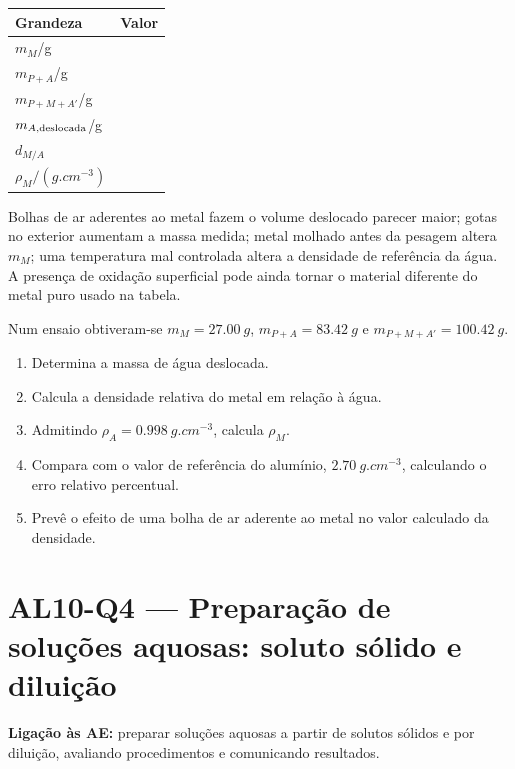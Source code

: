 \documentclass[11pt,a4paper,openany]{book}
\newcounter{exercicio}[chapter]
\renewcommand{\theexercicio}{\thechapter.\arabic{exercicio}}
\newenvironment{exercicio}[1][]%
{\refstepcounter{exercicio}%
\begin{tcolorbox}[breakable,colback=white,colframe=eublue!70,
 title={Exercício \theexercicio\if\relax\detokenize{#1}\relax\else\ --- #1\fi},fonttitle=\bfseries]}%
{\end{tcolorbox}}
\newcommand{\LigAE}[1]{\textbf{Ligação às AE:} #1}
\begin{document}
\begin{registo}
\begin{center}
\begin{tabular}{@{}lc@{}}
\toprule
Grandeza & Valor\\
\midrule
$m_M$/g &\\
$m_{P+A}$/g &\\
$m_{P+M+A'}$/g &\\
$m_{A,\rm deslocada}$/g &\\
$d_{M/A}$ &\\
$\rho_M/(\si{g.cm^{-3}})$ &\\
\bottomrule
\end{tabular}
\end{center}
\end{registo}

\begin{erros}
Bolhas de ar aderentes ao metal fazem o volume deslocado parecer maior; gotas no exterior aumentam a massa medida; metal molhado antes da pesagem altera $m_M$; uma temperatura mal controlada altera a densidade de referência da água. A presença de oxidação superficial pode ainda tornar o material diferente do metal puro usado na tabela.
\end{erros}

\begin{exercicio}[Identificar um metal]
Num ensaio obtiveram-se $m_M=\SI{27.00}{g}$, $m_{P+A}=\SI{83.42}{g}$ e $m_{P+M+A'}=\SI{100.42}{g}$.
\begin{enumerate}[label=\alph*)]
\item Determina a massa de água deslocada.
\item Calcula a densidade relativa do metal em relação à água.
\item Admitindo $\rho_A=\SI{0.998}{g.cm^{-3}}$, calcula $\rho_M$.
\item Compara com o valor de referência do alumínio, $\SI{2.70}{g.cm^{-3}}$, calculando o erro relativo percentual.
\item Prevê o efeito de uma bolha de ar aderente ao metal no valor calculado da densidade.
\end{enumerate}
\end{exercicio}

\section{AL10-Q4 — Preparação de soluções aquosas: soluto sólido e diluição}
\LigAE{preparar soluções aquosas a partir de solutos sólidos e por diluição, avaliando procedimentos e comunicando resultados.}
\end{document}
